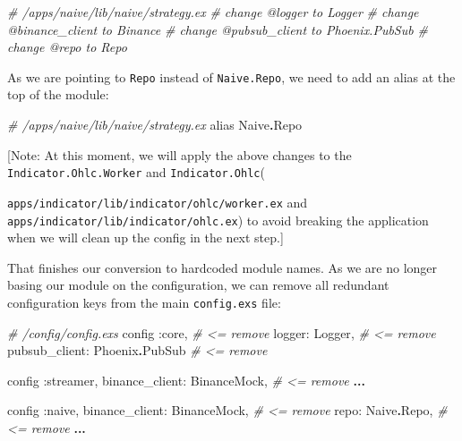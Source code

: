 \documentclass[
  oneside]{book}
\newenvironment{Shaded}{\begin{snugshade}}{\end{snugshade}}
\newcommand{\CommentTok}[1]{\textcolor[rgb]{0.56,0.35,0.01}{\textit{#1}}}
\newcommand{\ConstantTok}[1]{\textcolor[rgb]{0.56,0.35,0.01}{#1}}
\newcommand{\ImportTok}[1]{#1}
\newcommand{\NormalTok}[1]{#1}
\newcommand{\OperatorTok}[1]{\textcolor[rgb]{0.81,0.36,0.00}{\textbf{#1}}}
\newcommand{\VariableTok}[1]{\textcolor[rgb]{0.00,0.00,0.00}{#1}}
\begin{document}
\begin{Shaded}
\begin{Highlighting}[]
\CommentTok{\# /apps/naive/lib/naive/strategy.ex}
\CommentTok{\# change @logger to Logger}
\CommentTok{\# change @binance\_client to Binance}
\CommentTok{\# change @pubsub\_client to Phoenix.PubSub}
\CommentTok{\# change @repo to Repo}
\end{Highlighting}
\end{Shaded}

As we are pointing to \texttt{Repo} instead of \texttt{Naive.Repo}, we need to add an alias at the top of the module:

\begin{Shaded}
\begin{Highlighting}[]
\CommentTok{\# /apps/naive/lib/naive/strategy.ex}
\ImportTok{alias} \ConstantTok{Naive}\OperatorTok{.}\ConstantTok{Repo}
\end{Highlighting}
\end{Shaded}

{[}Note: At this moment, we will apply the above changes to the \texttt{Indicator.Ohlc.Worker} and \texttt{Indicator.Ohlc}(

\texttt{apps/indicator/lib/indicator/ohlc/worker.ex} and \texttt{apps/indicator/lib/indicator/ohlc.ex}) to avoid breaking the application when we will clean
up the config in the next step.{]}

\newpage

That finishes our conversion to hardcoded module names. As we are no longer basing our module on the configuration, we can remove all redundant configuration keys from the main \texttt{config.exs} file:

\begin{Shaded}
\begin{Highlighting}[]
\CommentTok{\# /config/config.exs}
\NormalTok{config }\VariableTok{:core}\NormalTok{,                   }\CommentTok{\# \textless{}= remove}
  \VariableTok{logger:} \ConstantTok{Logger}\NormalTok{,               }\CommentTok{\# \textless{}= remove}
  \VariableTok{pubsub\_client:} \ConstantTok{Phoenix}\OperatorTok{.}\ConstantTok{PubSub} \CommentTok{\# \textless{}= remove}

\NormalTok{config }\VariableTok{:streamer}\NormalTok{,}
  \VariableTok{binance\_client:} \ConstantTok{BinanceMock}\NormalTok{,  }\CommentTok{\# \textless{}= remove}
  \OperatorTok{...}

\NormalTok{config }\VariableTok{:naive}\NormalTok{,}
  \VariableTok{binance\_client:} \ConstantTok{BinanceMock}\NormalTok{,  }\CommentTok{\# \textless{}= remove}
  \VariableTok{repo:} \ConstantTok{Naive}\OperatorTok{.}\ConstantTok{Repo}\NormalTok{,             }\CommentTok{\# \textless{}= remove}
  \OperatorTok{...}
\end{Highlighting}
\end{Shaded}
\end{document}
